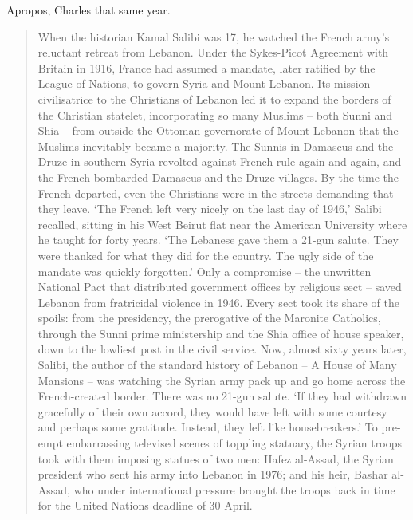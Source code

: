 Apropos, Charles \textcite{glass2005} that same year.
\begin{quote}
    When the historian Kamal Salibi was 17, he watched the French army’s reluctant retreat from Lebanon. Under the Sykes-Picot Agreement with Britain in 1916, France had assumed a mandate, later ratified by the League of Nations, to govern Syria and Mount Lebanon. Its mission civilisatrice to the Christians of Lebanon led it to expand the borders of the Christian statelet, incorporating so many Muslims – both Sunni and Shia – from outside the Ottoman governorate of Mount Lebanon that the Muslims inevitably became a majority. The Sunnis in Damascus and the Druze in southern Syria revolted against French rule again and again, and the French bombarded Damascus and the Druze villages. By the time the French departed, even the Christians were in the streets demanding that they leave. ‘The French left very nicely on the last day of 1946,’ Salibi recalled, sitting in his West Beirut flat near the American University where he taught for forty years. ‘The Lebanese gave them a 21-gun salute. They were thanked for what they did for the country. The ugly side of the mandate was quickly forgotten.’ Only a compromise – the unwritten National Pact that distributed government offices by religious sect – saved Lebanon from fratricidal violence in 1946. Every sect took its share of the spoils: from the presidency, the prerogative of the Maronite Catholics, through the Sunni prime ministership and the Shia office of house speaker, down to the lowliest post in the civil service. Now, almost sixty years later, Salibi, the author of the standard history of Lebanon – A House of Many Mansions – was watching the Syrian army pack up and go home across the French-created border. There was no 21-gun salute. ‘If they had withdrawn gracefully of their own accord, they would have left with some courtesy and perhaps some gratitude. Instead, they left like housebreakers.’ To pre-empt embarrassing televised scenes of toppling statuary, the Syrian troops took with them imposing statues of two men: Hafez al-Assad, the Syrian president who sent his army into Lebanon in 1976; and his heir, Bashar al-Assad, who under international pressure brought the troops back in time for the United Nations deadline of 30 April.
\end{quote}